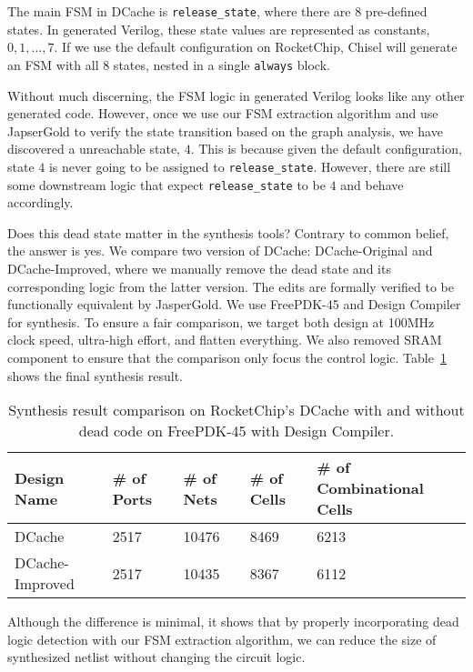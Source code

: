 \documentclass{article}
\begin{document}
The main FSM in DCache is \texttt{release\_state}, where there are 8 pre-defined states. In
generated Verilog, these state values are represented as constants, $0, 1, \dots, 7$. If we
use the default configuration on RocketChip, Chisel will generate an FSM with all 8 states,
nested in a single \texttt{always} block.

Without much discerning, the FSM logic in generated Verilog looks like any other generated
code. However, once we use our FSM extraction algorithm and use JapserGold to verify the
state transition based on the graph analysis, we have discovered a unreachable state,
$4$. This is because given the default configuration, state $4$ is never going to be
assigned to \texttt{release\_state}. However, there are still some downstream logic that
expect \texttt{release\_state} to be $4$ and behave accordingly.

Does this dead state matter in the synthesis tools? Contrary to common belief, the answer
is yes. We compare two version of DCache: DCache-Original and DCache-Improved, where we
manually remove the dead state and its corresponding logic from the latter version. The
edits are formally verified to be functionally equivalent by JasperGold. We
use FreePDK-45 and Design Compiler for synthesis. To ensure a fair comparison, we target
both design at 100MHz clock speed, ultra-high effort, and flatten everything. We also
removed SRAM component to ensure that the comparison only focus the control logic.
Table~\ref{table:1}
shows the final synthesis result.

\begin{table}[!htb]\label{table:1}
    \centering
    \caption{Synthesis result comparison on RocketChip's DCache with and without dead code on
    FreePDK-45 with Design Compiler.}
    \begin{tabular}{|l|l|l|l|l|}
        \hline
        Design Name     & \# of Ports & \# of Nets & \# of Cells & \# of Combinational Cells \\ \hline
        DCache          & 2517        & 10476      & 8469        & 6213                      \\ \hline
        DCache-Improved & 2517        & 10435      & 8367        & 6112                      \\ \hline
    \end{tabular}
\end{table}

Although the difference is minimal, it shows that by properly incorporating dead logic
detection with our FSM extraction algorithm, we can reduce the size of synthesized netlist
without changing the circuit logic.
\end{document}
